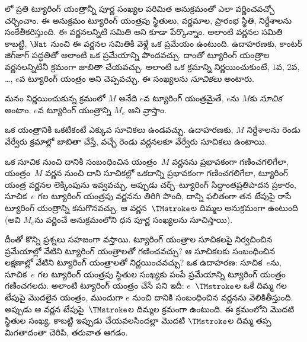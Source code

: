 \documentclass[../../../include/open-logic-section]{subfiles}
\begin{document}

లో ప్రతి ట్యూరింగ్ యంత్రాన్నీ పూర్ణ సంఖ్యల పరిమిత అనుక్రమంతో
ఎలా వర్ణించవచ్చో చర్చించాం. ఈ అనుక్రమం ట్యూరింగ్ యంత్రపు స్థితులు, వర్ణమాల,
ప్రారంభ స్థితి, నిర్దేశాలను సంకేతీకరిస్తుంది. ఈ వర్ణనలన్నిటి సమితి
 అని కూడా పేర్కొన్నాం. అలాంటి వర్ణనల సమితి 
కాబట్టి, $\Nat$ నుంచి ఈ వర్ణనల సమితికి వెళ్లే ఒక 
ప్రమేయం ఉంటుంది. ఉదాహరణకు, కాంటర్ జిగ్‌జాగ్ పద్ధతితో అలాంటి ఒక
 ప్రమేయాన్ని పొందవచ్చు. దాంతో ట్యూరింగ్ యంత్రాల
వర్ణనలన్నిటినీ క్రమంగా జాబితా చేయవచ్చు. అలాంటి ఒక క్రమాన్ని నిర్ణయించుకుంటే,
$1$వ, $2$వ, \dots, $e$వ ట్యూరింగ్ యంత్రం అని చెప్పవచ్చు. ఈ సంఖ్యలను
\emph{సూచికలు} అంటారు.

\begin{defn}
మనం నిర్ణయించుకున్న క్రమంలో $M$ అనేది $e$వ ట్యూరింగ్ యంత్రమైతే, $e$ను $M$కు
\emph{సూచిక} అంటాం. $e$వ ట్యూరింగ్ యంత్రాన్ని $M_e$ అని వ్రాస్తాం.
\end{defn}

ఒక యంత్రానికి ఒకటికంటే ఎక్కువ సూచికలు ఉండవచ్చు. ఉదాహరణకు, $M$ నిర్దేశాలను
రెండు వేర్వేరు క్రమాల్లో జాబితా చేస్తే, వచ్చే రెండు వర్ణనలకూ వేర్వేరు
సూచికలు ఉంటాయి.

ఒక సూచిక నుంచి దానికి సంబంధించిన యంత్రం~$M$ వర్ణనను ప్రభావకంగా గణించగలిగేలా,
యంత్రం~$M$ వర్ణన నుంచి దాని సూచికల్లో ఒకదాన్ని ప్రభావకంగా గణించగలిగేలా,
ట్యూరింగ్ యంత్ర వర్ణనల లెక్కింపును ఇవ్వవచ్చు. అప్పుడు చర్చ్--ట్యూరింగ్
సిద్ధాంతప్రతిపాదన ప్రకారం, సూచిక~$e$ గల ట్యూరింగ్ యంత్రపు వర్ణనను తిరిగి
పొంది, దాన్ని ఫలితంగా తన టేపుపై రాసే ట్యూరింగ్ యంత్రాన్ని
కనుగొనవచ్చు. ఆ వర్ణన~$\TMstroke$ల దిమ్మల అనుక్రమంగా ఉంటుంది (అవి $M_e$ను
వర్ణించే అనుక్రమంలోని ధన పూర్ణ సంఖ్యలను సూచిస్తాయి).

దీంతో కొన్ని ప్రశ్నలు సహజంగా వస్తాయి. ట్యూరింగ్ యంత్రాల సూచికలపై నిర్వచించిన
ప్రమేయాల్లో వేటిని ట్యూరింగ్ యంత్రాలతో గణించవచ్చు? ఆ సూచికలకు సంబంధించిన
లక్షణాల్లో వేటిని ట్యూరింగ్ యంత్రాలతో నిర్ణయించవచ్చు? ఒక ఉదాహరణ: సూచిక~$e$ను, సూచిక~$e$ గల
ట్యూరింగ్ యంత్రపు స్థితుల సంఖ్యకు పంపే ప్రమేయాన్ని ట్యూరింగ్ యంత్రం గణించగలదు.
అలాంటి ట్యూరింగ్ యంత్రం చేసే పని ఇదీ: $e$~$\TMstroke$ల ఒకే దిమ్మ గల టేపుపై
మొదలైన యంత్రం, ముందుగా $e$ నుంచి దానికి సంబంధించిన వర్ణనను వెలికితీస్తుంది.
అప్పుడు ఆ వర్ణన టేపుపై~$\TMstroke$ల దిమ్మల క్రమంగా ఉంటుంది. ఈ క్రమంలోని మొదటి
 స్థితుల సంఖ్య. కాబట్టి ఇప్పుడు చేయవలసిందల్లా మొదటి
$\TMstroke$ల దిమ్మ తప్ప మిగతాదంతా చెరిపి, తరువాత ఆగడం.
\end{document}
